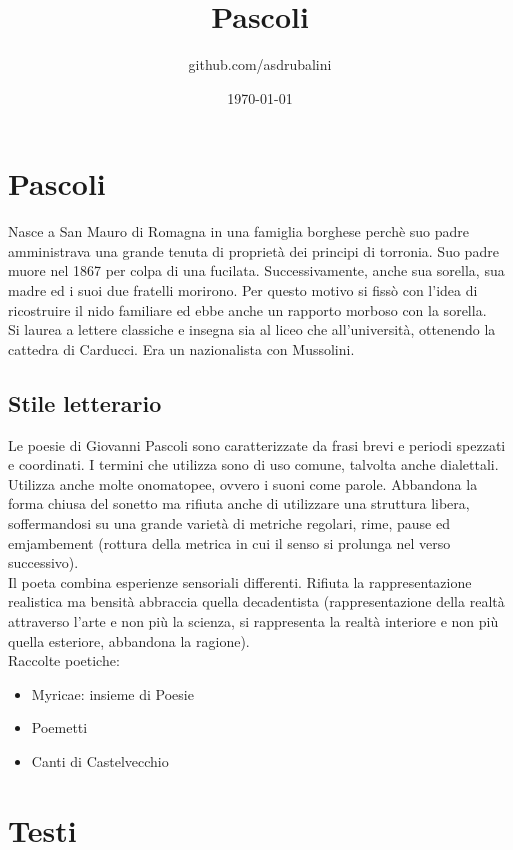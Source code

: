 \documentclass{article}
\title{Pascoli}
\author{github.com/asdrubalini}
\date{\today}
\begin{document}
\maketitle

\section{Pascoli}
Nasce a San Mauro di Romagna in una famiglia borghese perchè suo padre amministrava una grande tenuta di proprietà dei principi
di torronia. Suo padre muore nel 1867 per colpa di una fucilata. Successivamente, anche sua sorella, sua madre ed i suoi due
fratelli morirono. Per questo motivo si fissò con l'idea di ricostruire il nido familiare ed ebbe anche un rapporto morboso
con la sorella.\\
Si laurea a lettere classiche e insegna sia al liceo che all'università, ottenendo la cattedra di Carducci. Era un nazionalista
con Mussolini.

\subsection{Stile letterario}
Le poesie di Giovanni Pascoli sono caratterizzate da frasi brevi e periodi spezzati e coordinati. I termini che utilizza
sono di uso comune, talvolta anche dialettali. Utilizza anche molte onomatopee, ovvero i suoni come parole. Abbandona la forma
chiusa del sonetto ma rifiuta anche di utilizzare una struttura libera, soffermandosi su una grande varietà di metriche
regolari, rime, pause ed emjambement (rottura della metrica in cui il senso si prolunga nel verso successivo).\\
Il poeta combina esperienze sensoriali differenti. Rifiuta la rappresentazione realistica ma bensità abbraccia quella decadentista
(rappresentazione della realtà attraverso l'arte e non più la scienza, si rappresenta la realtà interiore e non più quella esteriore,
abbandona la ragione).\\

Raccolte poetiche:
\begin{itemize}
    \item Myricae: insieme di Poesie
    \item Poemetti
    \item Canti di Castelvecchio
\end{itemize}

\section{Testi}
\end{document}
